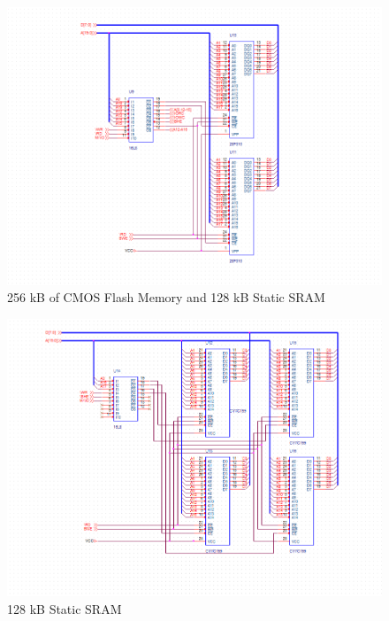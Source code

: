         \begin{figure}[ht]
            \begin{center}
                \includegraphics[width=1\textwidth]{figures/schematics/page3.png}
                \caption{256 kB of CMOS Flash Memory and 128 kB Static SRAM} \label{fig:page3}
            \end{center}
        \end{figure}

        \begin{figure}[ht]
            \begin{center}
                \includegraphics[width=1\textwidth]{figures/schematics/page4.png}
                \caption{128 kB Static SRAM} \label{fig:page4}
            \end{center}
        \end{figure}

